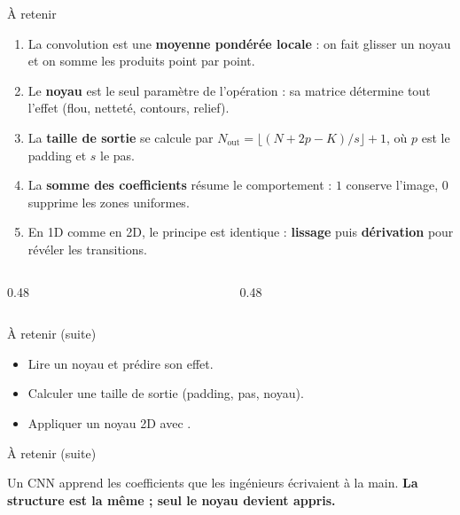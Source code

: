 \begin{frame}{À retenir}
\begin{kbox}
\begin{enumerate}
  \item La convolution est une \textbf{moyenne pondérée locale} : on fait
  glisser un noyau et on somme les produits point par point.
  \item Le \textbf{noyau} est le seul paramètre de l'opération : sa matrice
  détermine tout l'effet (flou, netteté, contours, relief).
  \item La \textbf{taille de sortie} se calcule par
  $N_{\text{out}} = \lfloor (N + 2p - K)/s \rfloor + 1$, où $p$ est le
  padding et $s$ le pas.
  \item La \textbf{somme des coefficients} résume le comportement : $1$
  conserve l'image, $0$ supprime les zones uniformes.
  \item En 1D comme en 2D, le principe est identique : \textbf{lissage} puis
  \textbf{dérivation} pour révéler les transitions.
\end{enumerate}
\end{kbox}
\vspace{1mm}
\begin{columns}[t]
\begin{column}{0.48\textwidth}
\begin{ebox}

\end{ebox}
\end{column}
\begin{column}{0.48\textwidth}

\end{column}
\end{columns}
\end{frame}
\begin{frame}{À retenir (suite)}
\begin{itemize}
  \item Lire un noyau et prédire son effet.
  \item Calculer une taille de sortie (padding, pas, noyau).
  \item Appliquer un noyau 2D avec .
\end{itemize}
\end{frame}
\begin{frame}{À retenir (suite)}
\begin{wbox}
Un CNN apprend les coefficients que les ingénieurs écrivaient à la main.
\textbf{La structure est la même ; seul le noyau devient appris.}
\end{wbox}
\end{frame}

